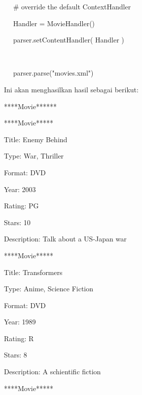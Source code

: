 \vspace{12pt}
\noindent 
~~  $  \#  $ override the default ContextHandler \par
\noindent 
~~ Handler = MovieHandler() \par
\noindent 
~~ parser.setContentHandler( Handler ) \par
\noindent 
~~  \par
\noindent 
~~ parser.parse("movies.xml") \par
\vspace{12pt}
\vspace{12pt}
\noindent 
Ini akan menghasilkan hasil sebagai berikut: \par
\noindent 
{\fontsize{10pt}{10pt}\selectfont *****Movie******} \par
\noindent 
{\fontsize{10pt}{10pt}\selectfont *****Movie*****} \par
\noindent 
{\fontsize{10pt}{10pt}\selectfont Title: Enemy Behind} \par
\noindent 
{\fontsize{10pt}{10pt}\selectfont Type: War, Thriller} \par
\noindent 
{\fontsize{10pt}{10pt}\selectfont Format: DVD} \par
\noindent 
{\fontsize{10pt}{10pt}\selectfont Year: 2003} \par
\noindent 
{\fontsize{10pt}{10pt}\selectfont Rating: PG} \par
\noindent 
{\fontsize{10pt}{10pt}\selectfont Stars: 10} \par
\noindent 
{\fontsize{10pt}{10pt}\selectfont Description: Talk about a US-Japan war} \par
\noindent 
{\fontsize{10pt}{10pt}\selectfont *****Movie*****} \par
\noindent 
{\fontsize{10pt}{10pt}\selectfont Title: Transformers} \par
\noindent 
{\fontsize{10pt}{10pt}\selectfont Type: Anime, Science Fiction} \par
\noindent 
{\fontsize{10pt}{10pt}\selectfont Format: DVD} \par
\noindent 
{\fontsize{10pt}{10pt}\selectfont Year: 1989} \par
\noindent 
{\fontsize{10pt}{10pt}\selectfont Rating: R} \par
\noindent 
{\fontsize{10pt}{10pt}\selectfont Stars: 8} \par
\noindent 
{\fontsize{10pt}{10pt}\selectfont Description: A schientific fiction} \par
\noindent 
{\fontsize{10pt}{10pt}\selectfont *****Movie*****} \par
